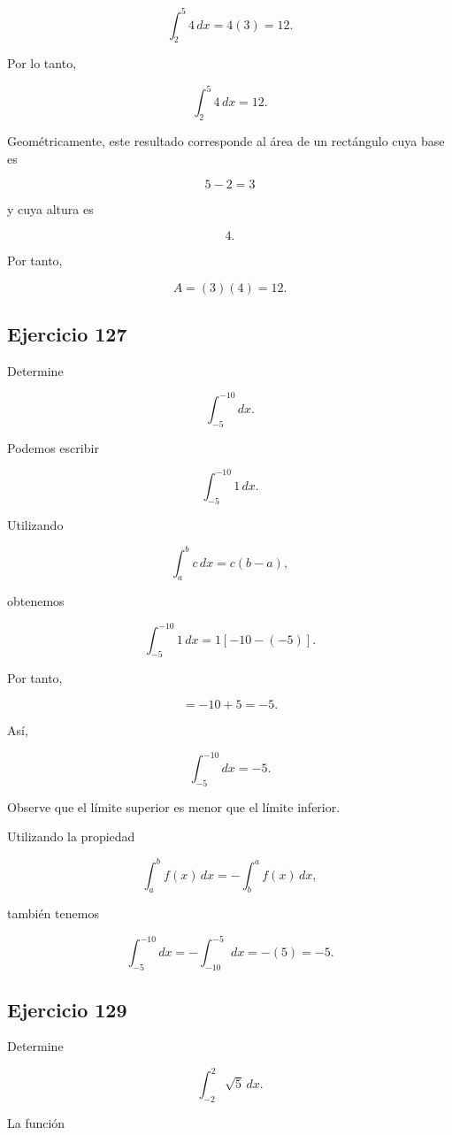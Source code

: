 \documentclass[12pt]{article}
\begin{document}
\[
\int_2^5 4\,dx
=
4(3)
=
12.
\]

Por lo tanto,

\[
\boxed{
\int_2^5 4\,dx=12
}.
\]

Geométricamente, este resultado corresponde al área de un rectángulo
cuya base es

\[
5-2=3
\]

y cuya altura es

\[
4.
\]

Por tanto,

\[
A=(3)(4)=12.
\]

\subsection*{Ejercicio 127}

Determine

\[
\int_{-5}^{-10}dx.
\]

Podemos escribir

\[
\int_{-5}^{-10}1\,dx.
\]

Utilizando

\[
\int_a^b c\,dx=c(b-a),
\]

obtenemos

\[
\int_{-5}^{-10}1\,dx
=
1[-10-(-5)].
\]

Por tanto,

\[
=
-10+5
=
-5.
\]

Así,

\[
\boxed{
\int_{-5}^{-10}dx=-5
}.
\]

Observe que el límite superior es menor que el límite inferior.

Utilizando la propiedad

\[
\int_a^b f(x)\,dx
=
-\int_b^a f(x)\,dx,
\]

también tenemos

\[
\int_{-5}^{-10}dx
=
-\int_{-10}^{-5}dx
=
-(5)
=
-5.
\]

\subsection*{Ejercicio 129}

Determine

\[
\int_{-2}^{2}\sqrt5\,dx.
\]

La función
\end{document}
